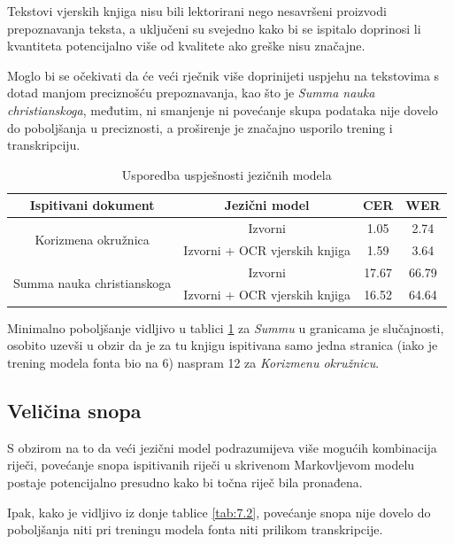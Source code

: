 \documentclass[zavrsnirad]{fer}
\begin{document}
Tekstovi vjerskih knjiga nisu bili lektorirani nego nesavršeni proizvodi prepoznavanja teksta, a uključeni su svejedno kako bi se ispitalo doprinosi li kvantiteta potencijalno više od kvalitete ako greške nisu značajne.

Moglo bi se očekivati da će veći rječnik više doprinijeti uspjehu na tekstovima s dotad manjom preciznošću prepoznavanja, kao što je \textit{Summa nauka christianskoga}, međutim, ni smanjenje ni povećanje skupa podataka nije dovelo do poboljšanja u preciznosti, a proširenje je značajno usporilo trening i transkripciju.

\bgroup
\def\arraystretch{1.25}
\begin{table}[h]
	\centering
	\begin{tabular}{|c|c|c|c|}
		\hline
		\textbf{Ispitivani dokument} & \textbf{Jezični model} & \textbf{CER} & \textbf{WER} \\ \hline
		\multirow{2}{*}{Korizmena okružnica} & Izvorni & 1.05 & 2.74 \\ \cline{2-4}
		 & Izvorni + OCR vjerskih knjiga & 1.59 & 3.64 \\ \hline
		\multirow{2}{*}{Summa nauka christianskoga} & Izvorni & 17.67 & 66.79 \\ \cline{2-4}
		 & Izvorni + OCR vjerskih knjiga & 16.52 & 64.64 \\ \hline
	\end{tabular}
	\caption{Usporedba uspješnosti jezičnih modela}
	\label{tab:lm_performance}
\end{table}
\egroup

Minimalno poboljšanje vidljivo u tablici \ref{tab:lm_performance} za \textit{Summu} u granicama je slučajnosti, osobito uzevši u obzir da je za tu knjigu ispitivana samo jedna stranica (iako je trening modela fonta bio na 6) naspram 12 za \textit{Korizmenu okružnicu}.

\subsection{Veličina snopa}

S obzirom na to da veći jezični model podrazumijeva više mogućih kombinacija riječi, povećanje snopa ispitivanih riječi u skrivenom Markovljevom modelu postaje potencijalno presudno kako bi točna riječ bila pronađena.

Ipak, kako je vidljivo iz donje tablice \ref{tab:7.2}, povećanje snopa nije dovelo do poboljšanja niti pri treningu modela fonta niti prilikom transkripcije.
\end{document}
